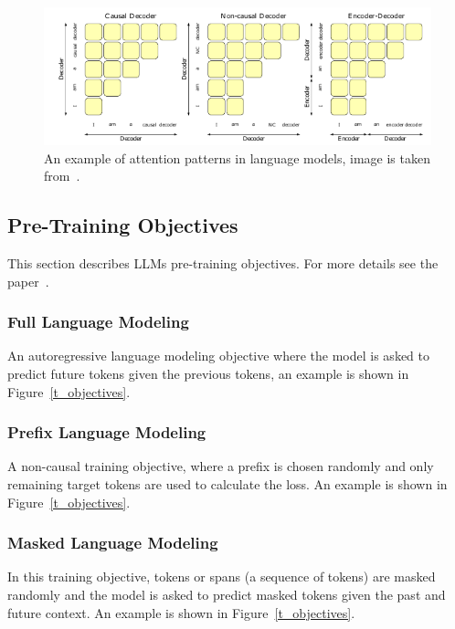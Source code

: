 
\begin{figure}[tbp]
\centering
\includegraphics[width=1\columnwidth]{Figure/architectures.png}
\caption{An example of attention patterns in language models, image is taken from~\cite{LLM_Objectives}.}
\label{architectures}
\end{figure}

\subsection{Pre-Training Objectives}
\label{sec:pretrainobjectives}
This section describes LLMs pre-training objectives. For more details see the paper~\cite{LLM_Objectives}. 

\subsubsection{Full Language Modeling}
An autoregressive language modeling objective where the model is asked to predict future tokens given the previous tokens, an example is shown in Figure~\ref{t_objectives}. 

\subsubsection{Prefix Language Modeling}
A non-causal training objective, where a prefix is chosen randomly and only remaining target tokens are used to calculate the loss. An example is shown in Figure~\ref{t_objectives}.

\subsubsection{Masked Language Modeling}
In this training objective, tokens or spans (a sequence of tokens) are masked randomly and the model is asked to predict masked tokens given the past and future context. An example is shown in Figure~\ref{t_objectives}. 

